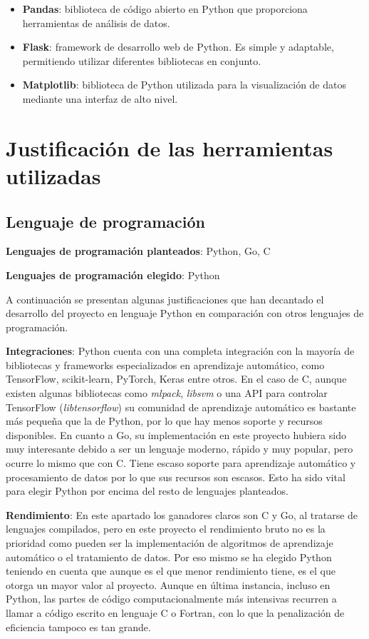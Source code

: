 \begin{itemize}
\item \textbf{Pandas}: biblioteca de código abierto en Python que proporciona herramientas de análisis de datos.

\item \textbf{Flask}: framework de desarrollo web de Python. Es simple y adaptable, permitiendo utilizar diferentes bibliotecas en conjunto.

\item \textbf{Matplotlib}: biblioteca de Python utilizada para la visualización de datos mediante una interfaz de alto nivel.
\end{itemize}

\section{Justificación de las herramientas utilizadas}

\subsection{Lenguaje de programación}
\textbf{Lenguajes de programación planteados}: Python, Go, C

\textbf{Lenguajes de programación elegido}: Python

A continuación se presentan algunas justificaciones que han decantado el desarrollo del proyecto en lenguaje Python en comparación con otros lenguajes de programación.

\textbf{Integraciones}: Python cuenta con una completa integración con la mayoría de bibliotecas y frameworks especializados en aprendizaje automático, como TensorFlow, scikit-learn, PyTorch, Keras entre otros. 
En el caso de C, aunque existen algunas bibliotecas como \textit{mlpack}, \textit{libsvm} o una API para controlar TensorFlow (\textit{libtensorflow}) su comunidad de aprendizaje automático es bastante más pequeña que la de Python, por lo que hay menos soporte y recursos disponibles.
En cuanto a Go, su implementación en este proyecto hubiera sido muy interesante debido a ser un lenguaje moderno, rápido y muy popular, pero ocurre lo mismo que con C. Tiene escaso soporte para aprendizaje automático y procesamiento de datos por lo que sus recursos son escasos.
Esto ha sido vital para elegir Python por encima del resto de lenguajes planteados.

\textbf{Rendimiento}: En este apartado los ganadores claros son C y Go, al tratarse de lenguajes compilados, pero en este proyecto el rendimiento bruto no es la prioridad como pueden ser la implementación de algoritmos de aprendizaje automático o el tratamiento de datos.
Por eso mismo se ha elegido Python teniendo en cuenta que aunque es el que menor rendimiento tiene, es el que otorga un mayor valor al proyecto. Aunque en última instancia, incluso en Python, las partes de código computacionalmente más intensivas recurren a llamar a código escrito en lenguaje C o Fortran, con lo que la penalización de eficiencia tampoco es tan grande.

